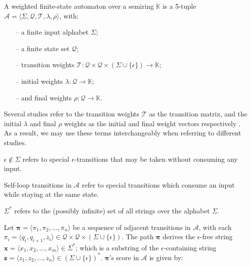 \begin{definition}
  \label{def:wfsa}
  A weighted finite-state automaton over a semiring $\mathbb{K}$ is a 5-tuple $\mathcal{A} = \langle \Sigma, \mathcal{Q}, \mathcal{T}, \lambda, \rho \rangle$, with:

  \begin{itemize}
    \itemsep0em 
    \item[--] a finite input alphabet $\Sigma$;
    \item[--] a finite state set $\mathcal{Q}$;
    \item[--] transition weights $\mathcal{T}: \mathcal{Q} \times \mathcal{Q} \times (\Sigma \cup \{\epsilon\}) \rightarrow \mathbb{K}$;
    \item[--] initial weights $\lambda: \mathcal{Q} \rightarrow \mathbb{K}$; 
    \item[--] and final weights $\rho: \mathcal{Q} \rightarrow \mathbb{K}$.
  \end{itemize}

  \begin{remark}
    Several studies refer to the transition weights $\mathcal{T}$ as the transition matrix, and the initial $\lambda$ and final $\rho$ weights as the initial and final weight vectors respectively \citep{schwartz2018sopa,jiang2020cold}. As a result, we may use these terms interchangeably when referring to different studies.
  \end{remark}
  
  \begin{remark}
    $\epsilon \notin \Sigma$ refers to special $\epsilon$-transitions that may be taken without consuming any input.
  \end{remark}

  \begin{remark}
    Self-loop transitions in $\mathcal{A}$ refer to special transitions which consume an input while staying at the same state.
  \end{remark}
  
  \begin{remark}
    $\Sigma^{*}$ refers to the (possibly infinite) set of all strings over the alphabet $\Sigma$.
  \end{remark}
   
\end{definition}

\begin{definition}

  Let $\pmb{\pi} = \langle \pi_1, \pi_2, \dots, \pi_n \rangle$ be a sequence of adjacent transitions in $\mathcal{A}$, with each $\pi_i = \langle q_i, q_{i+1}, z_i \rangle \in \mathcal{Q} \times \mathcal{Q} \times (\Sigma \cup \{\epsilon\})$. The path $\pmb{\pi}$ derives the $\epsilon$-free string $\pmb{x} = \langle x_1, x_2, \dots, x_m \rangle \in \Sigma^{*}$; which is a substring of the $\epsilon$-containing string $\pmb{z} = \langle z_1, z_2, \dots, z_n \rangle \in (\Sigma \cup \{\epsilon\})^{*}$. $\pmb{\pi}$'s score in $\mathcal{A}$ is given by:
  
\end{definition}

